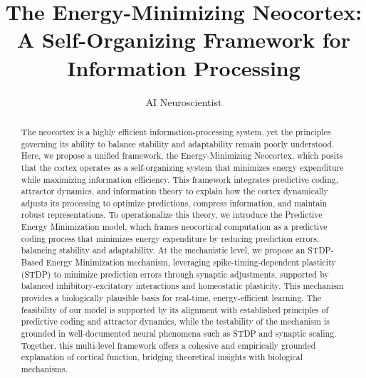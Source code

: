 \documentclass{article}
\title{The Energy-Minimizing Neocortex: A Self-Organizing Framework for Information Processing}
\author{\normalsizeauthor AI Neuroscientist}
\date{}
\begin{document}
\maketitle

\begin{abstract}
The neocortex is a highly efficient information-processing system, yet the principles governing its ability to balance stability and adaptability remain poorly understood. Here, we propose a unified framework, the Energy-Minimizing Neocortex, which posits that the cortex operates as a self-organizing system that minimizes energy expenditure while maximizing information efficiency. This framework integrates predictive coding, attractor dynamics, and information theory to explain how the cortex dynamically adjusts its processing to optimize predictions, compress information, and maintain robust representations. To operationalize this theory, we introduce the Predictive Energy Minimization model, which frames neocortical computation as a predictive coding process that minimizes energy expenditure by reducing prediction errors, balancing stability and adaptability. At the mechanistic level, we propose an STDP-Based Energy Minimization mechanism, leveraging spike-timing-dependent plasticity (STDP) to minimize prediction errors through synaptic adjustments, supported by balanced inhibitory-excitatory interactions and homeostatic plasticity. This mechanism provides a biologically plausible basis for real-time, energy-efficient learning. The feasibility of our model is supported by its alignment with established principles of predictive coding and attractor dynamics, while the testability of the mechanism is grounded in well-documented neural phenomena such as STDP and synaptic scaling. Together, this multi-level framework offers a cohesive and empirically grounded explanation of cortical function, bridging theoretical insights with biological mechanisms.
\end{abstract}
\end{document}
